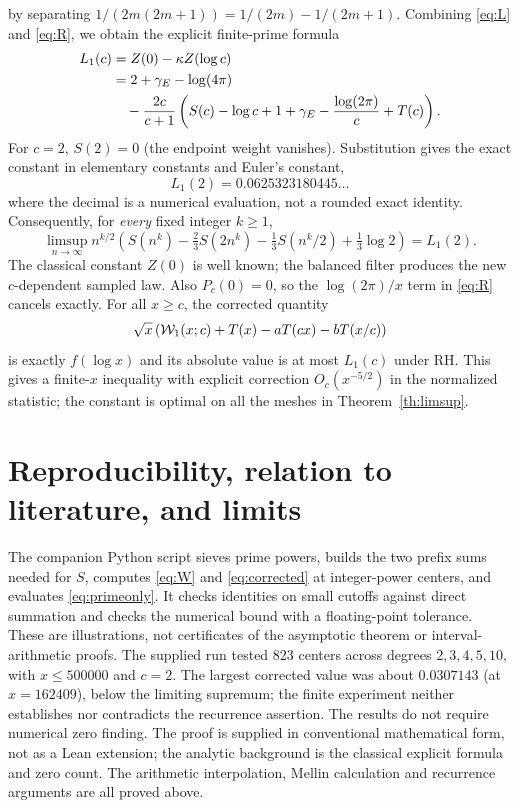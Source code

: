 \documentclass[11pt]{article}
\theoremstyle{remark}\newtheorem{remark}[theorem]{Remark}
\begin{document}
by separating $1/(2m(2m+1))=1/(2m)-1/(2m+1)$. Combining \eqref{eq:L} and \eqref{eq:R}, we obtain the explicit finite-prime formula
\begin{align}
 L_1(c)&=Z(0)-\kappa Z(\log c)\notag\\
 &=2+\gamma_E-\log(4\pi)\notag\\
 &\quad-\frac{2c}{c+1}\left(S(c)-\log c+1+\gamma_E
 -\frac{\log(2\pi)}c+T(c)\right).\label{eq:primeonly}
\end{align}
For $c=2$, $S(2)=0$ (the endpoint weight vanishes). Substitution gives the exact constant in elementary constants and Euler's constant,
\begin{equation}\label{eq:constant}
 \boxed{ L_1(2)=0.0625323180445\ldots }
\end{equation}
where the decimal is a numerical evaluation, not a rounded exact identity. Consequently, for \emph{every} fixed integer $k\ge1$,
\[
 \limsup_{n\to\infty} n^{k/2}\left(S(n^k)-\tfrac23 S(2n^k)
 -\tfrac13 S(n^k/2)+\tfrac13\log2\right)=L_1(2).
\]
The classical constant $Z(0)$ is well known; the balanced filter produces the new $c$-dependent sampled law. Also $P_c(0)=0$, so the $\log(2\pi)/x$ term in \eqref{eq:R} cancels exactly. For all $x\ge c$, the corrected quantity
\begin{equation}\label{eq:corrected}
 \sqrt x\left(\mathcal W_1(x;c)+T(x)-aT(cx)-bT(x/c)\right)
\end{equation}
is exactly $f(\log x)$ and its absolute value is at most $L_1(c)$ under RH. This gives a finite-$x$ inequality with explicit correction $O_c(x^{-5/2})$ in the normalized statistic; the constant is optimal on all the meshes in Theorem~\ref{th:limsup}.

\section{Reproducibility, relation to literature, and limits}
The companion Python script sieves prime powers, builds the two prefix sums needed for $S$, computes \eqref{eq:W} and \eqref{eq:corrected} at integer-power centers, and evaluates \eqref{eq:primeonly}. It checks identities on small cutoffs against direct summation and checks the numerical bound with a floating-point tolerance. These are illustrations, not certificates of the asymptotic theorem or interval-arithmetic proofs. The supplied run tested 823 centers across degrees $2,3,4,5,10$, with $x\le500000$ and $c=2$. The largest corrected value was about $0.0307143$ (at $x=162409$), below the limiting supremum; the finite experiment neither establishes nor contradicts the recurrence assertion. The results do not require numerical zero finding. The proof is supplied in conventional mathematical form, not as a Lean extension; the analytic background is the classical explicit formula and zero count. The arithmetic interpolation, Mellin calculation and recurrence arguments are all proved above.
\end{document}
